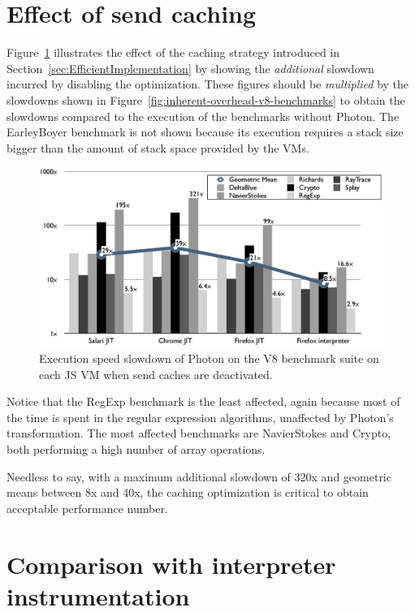 \section{Effect of send caching}

Figure~\ref{fig:send-cache-effect} illustrates the effect of the caching
strategy introduced in Section~\ref{sec:EfficientImplementation} by showing the
\textit{additional} slowdown incurred by disabling the optimization. These
figures should be \textit{multiplied} by the slowdowns shown in
Figure~\ref{fig:inherent-overhead-v8-benchmarks} to obtain the slowdowns
compared to the execution of the benchmarks without Photon. The EarleyBoyer
benchmark is not shown because its execution requires a stack size bigger than
the amount of stack space provided by the VMs.

\begin{figure}[htbp]
\begin{center}
\includegraphics[width=.85\textwidth]{figures/effectSendCaches}
\caption[Execution speed slowdown of Photon with deactivated send caches]{Execution speed slowdown of Photon on the V8 benchmark suite on each JS VM when send caches are deactivated.}
\label{fig:send-cache-effect}
\end{center}
\end{figure}

Notice that the RegExp benchmark is the least affected, again because most of
the time is spent in the regular expression algorithms, unaffected by Photon's
transformation. The most affected benchmarks are NavierStokes and Crypto, both
performing a high number of array operations.

Needless to say, with a maximum additional slowdown of 320x and geometric means
between 8x and 40x, the caching optimization is critical to obtain acceptable
performance number.


\FloatBarrier

\section{Comparison with interpreter instrumentation}

